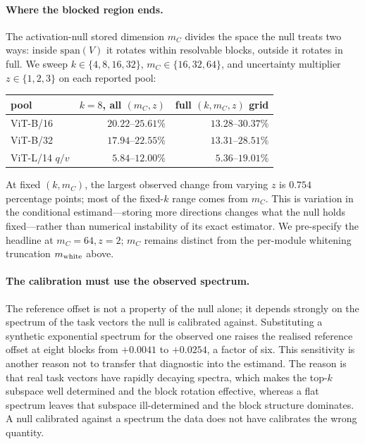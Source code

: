 \paragraph{Where the blocked region ends.}
The activation-null stored dimension $m_C$ divides the space the null treats two ways: inside
$\mathrm{span}(V)$ it rotates within resolvable blocks, outside it rotates in full. We sweep
$k\in\{4,8,16,32\}$, $m_C\in\{16,32,64\}$, and uncertainty multiplier
$z\in\{1,2,3\}$ on each reported pool:

\begin{table}[h]
\centering
\begin{tabular}{@{}lrr@{}}
\toprule
pool & $k=8$, all $(m_C,z)$ & full $(k,m_C,z)$ grid \\
\midrule
ViT-B/16 & $20.22$--$25.61\%$ & $13.28$--$30.37\%$ \\
ViT-B/32 & $17.94$--$22.55\%$ & $13.31$--$28.51\%$ \\
ViT-L/14 $q/v$ & $5.84$--$12.00\%$ & $5.36$--$19.01\%$ \\
\bottomrule
\end{tabular}
\end{table}

At fixed $(k,m_C)$, the largest observed change from varying $z$ is $0.754$ percentage points; most of
the fixed-$k$ range comes from $m_C$. This is variation in the conditional estimand---storing more
directions changes what the null holds fixed---rather than numerical instability of its exact
estimator. We pre-specify the headline at $m_C=64,z=2$; $m_C$ remains distinct from the per-module
whitening truncation $m_{\rm white}$ above.

\paragraph{The calibration must use the observed spectrum.} The reference offset is not a property
of the null alone; it depends strongly on the spectrum of the task vectors the null is
calibrated against. Substituting a synthetic exponential spectrum for the observed one raises
the realised reference offset at eight blocks from $+0.0041$ to $+0.0254$, a factor of six.
This sensitivity is another reason not to transfer that diagnostic into the estimand.
The reason is that real task
vectors have rapidly decaying spectra, which makes the top-$k$ subspace well determined and the
block rotation effective, whereas a flat spectrum leaves that subspace ill-determined and the
block structure dominates. A null calibrated against a spectrum the data does not have
calibrates the wrong quantity.

